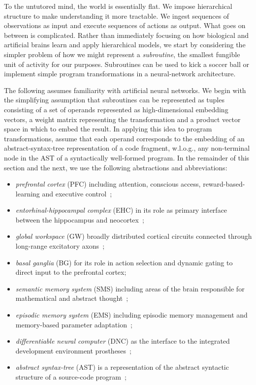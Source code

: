 To the untutored mind, the world is essentially flat. We impose hierarchical structure to make understanding it more tractable. We ingest sequences of observations as input and execute sequences of actions as output. What goes on between is complicated. Rather than immediately focusing on how biological and artificial brains learn and apply hierarchical models, we start by considering the simpler problem of how we might represent a {\it{subroutine}}, the smallest fungible unit of activity for our purposes. Subroutines can be used to kick a soccer ball or implement simple program transformations in a neural-network architecture.


The following assumes familiarity with artificial neural networks. We begin with the simplifying assumption that subroutines can be represented as tuples consisting of a set of operands represented as high-dimensional embedding vectors, a weight matrix representing the transformation and a product vector space in which to embed the result. In applying this idea to program transformations, assume that each operand corresponds to the embedding of an abstract-syntax-tree representation of a code fragment, w.l.o.g., any non-terminal node in the AST of a syntactically well-formed program. In the remainder of this section and the next, we use the following abstractions and abbreviations:
%
\begin{itemize}
%
\item {\it{prefrontal cortex}} (PFC) including attention, conscious access, reward-based-learning and executive control~\cite{WangetalNATURE-NEUROSCIENCE-18,KrieteetalPNAS-13};
%
\item {\it{entorhinal-hippocampal complex}} (EHC) in its role as primary interface between the hippocampus and neocortex~\cite{OReillyetalCS-15,OReillySCIENCE-06};
%
\item {\it{global workspace}} (GW) broadly distributed cortical circuits connected through long-range excitatory axons~\cite{DehaeneetalPNAS-98,Baars1988};
%
\item {\it{basal ganglia}} (BG) for its role in action selection and dynamic gating to direct input to the prefrontal cortex\cite{OReillyetalLEABRA-16,KrieteetalPNAS-13};
% 
\item {\it{semantic memory system}} (SMS) including areas of the brain responsible for mathematical and abstract thought~\cite{Tulving1972,BinderandDesaiTiCS-11};
%
\item {\it{episodic memory system}} (EMS) including episodic memory management and memory-based parameter adaptation~\cite{SprechmannetalICLR-18,PritzeletalICML-17};
%
\item {\it{differentiable neural computer}} (DNC) as the interface to the integrated development environment prostheses~\cite{GravesetalNATURE-16,GravesetalCoRR-14};
%
\item {\it{abstract syntax-tree}} (AST) is a representation of the abstract syntactic structure of a source-code program~\cite{DevlinetalICLR-18,WangetalCoRR-17};
% 
\end{itemize}

